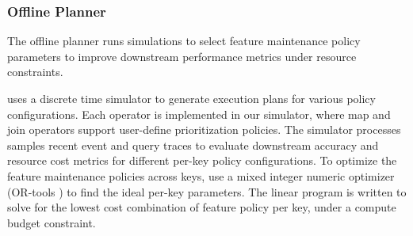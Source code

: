 %



%
%
%
%


%

\subsubsection{Offline Planner}
\label{s:planner}
The offline planner runs simulations to select feature maintenance policy parameters to improve downstream performance metrics under resource constraints.  

\system{} uses a discrete time simulator to generate execution plans for various policy configurations. Each \system{} operator is implemented in our simulator, where map and join operators support user-define prioritization policies. The simulator processes samples recent event and query traces to evaluate downstream accuracy and resource cost metrics for different per-key policy configurations. To optimize the feature maintenance policies across keys, \system{} use a mixed integer numeric optimizer (OR-tools \cite{van2014or}) to find the ideal per-key parameters. The linear program is written to solve for the lowest cost combination of feature policy per key, under a compute budget constraint. 


